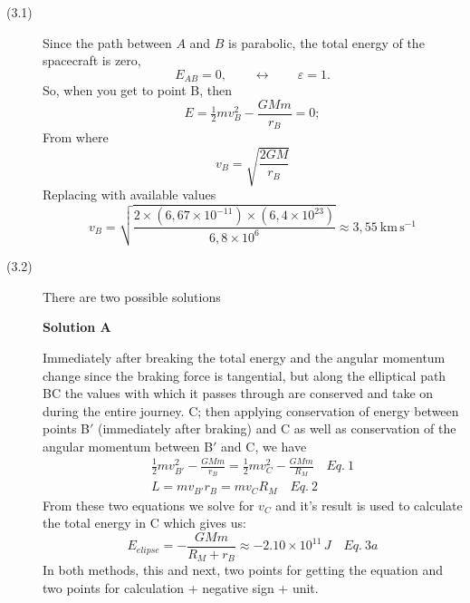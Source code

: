 \begin{description}
\item[(3.1)] Since the path between $A$ and $B$ is parabolic, the total
energy of the spacecraft is zero,
\[ E_{AB} = 0, \qquad \leftrightarrow \qquad \varepsilon = 1. \]
So, when you get to point B, then
\begin{equation*}
E = \tfrac{1}{2}mv_B^2 - \frac{GMm}{r_B} = 0; \tag*{[1 point]}
\end{equation*}
From where
\begin{equation*}
v_B = \sqrt{\frac{2GM}{r_B}} \tag*{[1 point]}
\end{equation*}
Replacing with available values
\begin{equation*}
v_B = \sqrt{\frac{2 \times (6{,}67 \times 10^{-11}) \times
  (6{,}4 \times 10^{23})}{6{,}8 \times 10^{6}}}
  \approx 3{,}55\ \mathrm{km\,s^{-1}} \tag*{[1 point]}
\end{equation*}

\item[(3.2)] There are two possible solutions

\textbf{Solution A}

Immediately after breaking %
the total energy and the angular momentum change since the braking force is
tangential, but along the elliptical path BC the values with which it passes
through are conserved and take on during the entire journey. C; then applying
conservation of energy between points B$'$ (immediately after braking) and C
as well as conservation of the angular momentum between B$'$ and C, we have
\begin{gather*}
\tfrac{1}{2}mv_{B'}^2 - \frac{GMm}{r_B}
  = \tfrac{1}{2}mv_C^2 - \frac{GMm}{R_M} \quad Eq.~1
  \tag*{[1 point]} \\
L = mv_{B'}r_B = mv_C R_M \quad Eq.~2 \tag*{[1 point]}
\end{gather*}
From these two equations we solve for $v_C$ and it's result is used to
calculate the total energy in C which gives us:
\begin{equation*}
E_{elipse} = -\frac{GMm}{R_M + r_B} \approx -2.10 \times 10^{11}\,J
  \quad Eq.~3a \tag*{[2 points]}
\end{equation*}
In both methods, this and next, two points for getting the equation and two
points for calculation + negative sign + unit.
\end{description}
